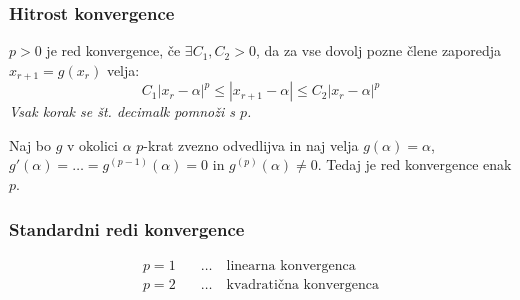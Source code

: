 \begin{multicols}{4}
\subsubsection{Hitrost konvergence}
$p > 0$ je red konvergence, če $\exists C_1, C_2 > 0$, da za vse dovolj pozne člene zaporedja $x_{r+1} = g(x_r)$ velja:
\[ C_1 |x_r - \alpha|^p \leq |x_{r+1} - \alpha| \leq C_2 |x_r - \alpha|^p \]
\textit{Vsak korak se št. decimalk pomnoži s $p$.}

Naj bo $g$ v okolici $\alpha$ $p$-krat zvezno odvedlijva in naj velja 
$g(\alpha) = \alpha$, $g'(\alpha) = \dots = g^{(p-1)}(\alpha) = 0$ in $g^{(p)}(\alpha) \neq 0$.
Tedaj je red konvergence enak $p$.

\subsubsection{Standardni redi konvergence}
\begin{align*}
	p=1 & \quad \dots \quad \text{linearna konvergenca} \\
	p=2 & \quad \dots \quad \text{kvadratična konvergenca}
\end{align*}
\end{multicols}
